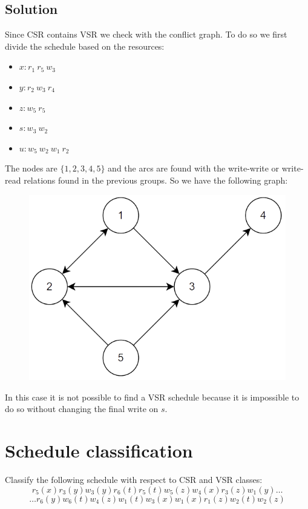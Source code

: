 \documentclass[12pt, a4paper]{report}
\newtheorem[style=M,bodystyle=\normalfont]{theorem}{Theorem}
\newtheorem[style=M,bodystyle=\normalfont]{corollary}{Corollary}
\newtheorem[style=M,bodystyle=\normalfont]{lemma}{Lemma}
\newtheorem[style=M,bodystyle=\normalfont]{definition}{Definition}
\begin{document}
    \subsection*{Solution}
        Since CSR contains VSR we check with the conflict graph. To do so we first divide the schedule based on the resources: 
        \begin{itemize}
            \item $x: r_1 \: r_5 \: w_3$
            \item $y: r_2 \: w_3 \: r_4$
            \item $z: w_5 \: r_5$
            \item $s: w_3 \: w_2$
            \item $u: w_5 \: w_2 \: w_1 \: r_2$
        \end{itemize}
        The nodes are $\{1,2,3,4,5\}$ and the arcs are found with the write-write or write-read relations found in the previous groups. So we have the following graph:
        \begin{figure}[H]
            \centering
            \includegraphics[width=0.5\linewidth]{images/conflictgraph2.png}
        \end{figure}
        In this case it is not possible to find a VSR schedule because it is impossible to do so without changing the final write on $s$. 

    \newpage

    \section{Schedule classification}
        Classify the following schedule with respect to CSR and VSR classes:  
        \[r_5(x) r_3(y) w_3(y) r_6(t) r_5(t) w_5(z) w_4(x) r_3(z) w_1(y) \dots\]
        \[\dots r_6(y) w_6(t) w_4(z) w_1(t) w_3(x) w_1(x) r_1(z) w_2(t) w_2(z)\]
\end{document}
